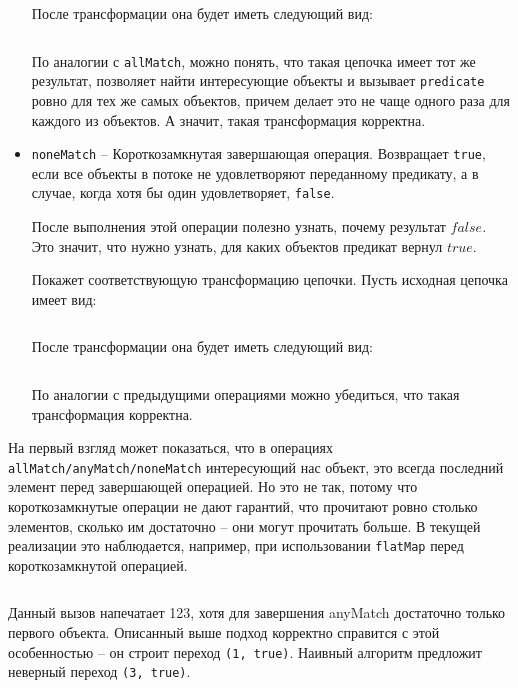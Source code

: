 \begin{itemize}
	\inputminted{java}{chapter2/code/anyMatch.java}
	
	После трансформации она будет иметь следующий вид:
	
	\inputminted{java}{chapter2/code/anyMatchTransform.java}
	
	По аналогии с \texttt{allMatch}, можно понять, что такая цепочка имеет тот же результат, позволяет найти интересующие объекты и вызывает \texttt{predicate} ровно для тех же самых объектов, причем делает это не чаще одного раза для каждого из объектов. А значит, такая трансформация корректна.
	\item \texttt{noneMatch} -- Короткозамкнутая завершающая операция. Возвращает \texttt{true}, если все объекты в потоке не удовлетворяют переданному предикату, а в случае, когда хотя бы один удовлетворяет, \texttt{false}.
	
	После выполнения этой операции полезно узнать, почему результат $false$. Это значит, что нужно узнать, для каких объектов предикат вернул $true$. 
	
	Покажет соответствующую трансформацию цепочки. Пусть исходная цепочка имеет вид:
	\inputminted{java}{chapter2/code/noneMatch.java}
	
	После трансформации она будет иметь следующий вид:
	
	\inputminted{java}{chapter2/code/noneMatchTransform.java}
	
	По аналогии с предыдущими операциями можно убедиться, что такая трансформация корректна.
\end{itemize}

На первый взгляд может показаться, что в операциях \texttt{allMatch/anyMatch/noneMatch} интересующий нас объект, это всегда последний элемент перед завершающей операцией. Но это не так, потому что короткозамкнутые операции не дают гарантий, что прочитают ровно столько элементов, сколько им достаточно -- они могут прочитать больше. В текущей реализации это наблюдается, например, при использовании \texttt{flatMap} перед короткозамкнутой операцией. 
\inputminted{java}{chapter2/code/flatMapBeforeAnyMatch.java}
Данный вызов напечатает 123, хотя для завершения anyMatch достаточно только первого объекта. Описанный выше подход корректно справится с этой особенностью -- он строит переход \texttt{(1, true)}. Наивный алгоритм предложит неверный переход \texttt{(3, true)}.

